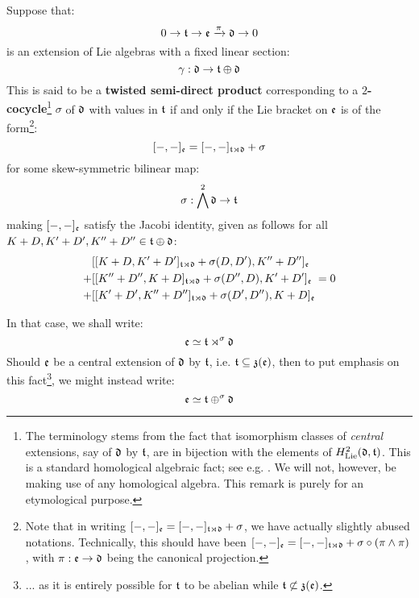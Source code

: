        \begin{definition} \label{def: twisted_semi_direct_products} 
            Suppose that:
                $$0 \to \mathfrak{t} \to \mathfrak{e} \xrightarrow[]{\pi} \mathfrak{d} \to 0$$
            is an extension of Lie algebras with a fixed linear section:
                $$\gamma: \mathfrak{d} \to \mathfrak{t} \oplus \mathfrak{d}$$
            This is said to be a \textbf{twisted semi-direct product} corresponding to a \textbf{$2$-cocycle}\footnote{The terminology stems from the fact that isomorphism classes of \textit{central} extensions, say of $\mathfrak{d}$ by $\mathfrak{t}$, are in bijection with the elements of $H^2_{\mathrm{Lie}}(\mathfrak{d}, \mathfrak{t})$. This is a standard homological algebraic fact; see e.g. \cite{hilton_stammbach_homological_algebra}. We will not, however, be making use of any homological algebra. This remark is purely for an etymological purpose.} $\sigma$ of $\mathfrak{d}$ with values in $\mathfrak{t}$ if and only if the Lie bracket on $\mathfrak{e}$ is of the form\footnote{Note that in writing $[-, -]_{\mathfrak{e}} = [-, -]_{\mathfrak{t} \rtimes \mathfrak{d}} + \sigma$, we have actually slightly abused notations. Technically, this should have been $[-, -]_{\mathfrak{e}} = [-, -]_{\mathfrak{t} \rtimes \mathfrak{d}} + \sigma \circ ( \pi \wedge \pi )$, with $\pi: \mathfrak{e} \to \mathfrak{d}$ being the canonical projection.}:
                $$[-, -]_{\mathfrak{e}} = [-, -]_{\mathfrak{t} \rtimes \mathfrak{d}} + \sigma$$
            for some skew-symmetric bilinear map:
                $$\sigma: \bigwedge^2 \mathfrak{d} \to \mathfrak{t}$$
            making $[-, -]_{\mathfrak{e}}$ satisfy the Jacobi identity, given as follows for all $K + D, K' + D', K'' + D'' \in \mathfrak{t} \oplus \mathfrak{d}$:
                $$
                    \begin{aligned}
                        & [[K + D, K' + D']_{\mathfrak{t} \rtimes \mathfrak{d}} + \sigma(D, D'), K'' + D'']_{\mathfrak{e}}
                        \\
                        + & [[K'' + D'', K + D]_{\mathfrak{t} \rtimes \mathfrak{d}} + \sigma(D'', D), K' + D']_{\mathfrak{e}}
                        \\
                        + & [[K' + D', K'' + D'']_{\mathfrak{t} \rtimes \mathfrak{d}} + \sigma(D', D''), K + D]_{\mathfrak{e}}
                    \end{aligned}
                    = 0
                $$
            
            In that case, we shall write:
                $$\mathfrak{e} \simeq \mathfrak{t} \rtimes^{\sigma} \mathfrak{d}$$
            Should $\mathfrak{e}$ be a central extension of $\mathfrak{d}$ by $\mathfrak{t}$, i.e. $\mathfrak{t} \subseteq \mathfrak{z}(\mathfrak{e})$, then to put emphasis on this fact\footnote{... as it is entirely possible for $\mathfrak{t}$ to be abelian while $\mathfrak{t} \not \subset \mathfrak{z}(\mathfrak{e})$.}, we might instead write:
                $$\mathfrak{e} \simeq \mathfrak{t} \oplus^{\sigma} \mathfrak{d}$$
        \end{definition}
